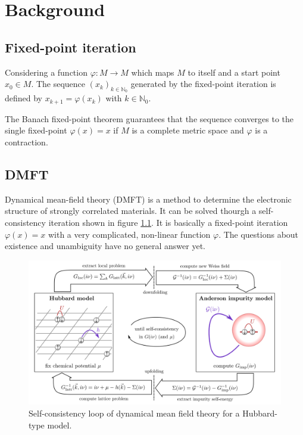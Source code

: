 \chapter{Background}
\label{ch:background}

\section{Fixed-point iteration}

Considering a function \(\varphi\colon M \to M\) which maps \(M\) to itself and a start point \(x_0 \in M\). The sequence \((x_k)_{k \in \mathbb{N}_0}\) generated by the fixed-point iteration is defined by \(x_{k+1} = \varphi(x_k)\) with \(k \in \mathbb{N}_0\).

The Banach fixed-point theorem guarantees that the sequence converges to the single fixed-point \(\varphi(x) = x\) if \(M\) is a complete metric space and \(\varphi\) is a contraction.

\section{DMFT}

Dynamical mean-field theory (DMFT) is a method to determine the electronic structure of strongly correlated materials. It can be solved thourgh a self-consistency iteration shown in figure \ref{fig:dmft}.
It is basically a fixed-point iteration \(\varphi(x) = x\) with a very complicated, non-linear function \(\varphi\). The questions about existence and unambiguity have no general answer yet.

\begin{figure}[H]
    \centering
    \includegraphics[width=1.0\textwidth]{figures/dmft.png}
    \caption{Self-consistency loop of dynamical mean field theory for a Hubbard-type model.}
    \label{fig:dmft}
\end{figure}

